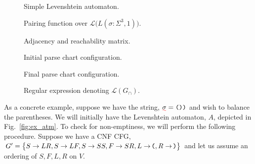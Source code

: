 \documentclass[sigplan,review,acmsmall,nonacm,screen,anonymous]{acmart}\settopmatter{printfolios=false,printccs=false,printacmref=false}
\begin{document}
\begin{figure}
\resizebox{0.4\textwidth}{!}{%

}
\caption{Simple Levenshtein automaton.}\label{fig:ex_atm}

\vspace{0.3cm}
\resizebox{0.4\textwidth}{!}{%

}
\caption{Pairing function over $\mathcal{L}\big(L(\sigma: \Sigma^3, 1)\big)$.}\label{fig:pairing_fun}

\vspace{0.3cm}
\begin{center}
\resizebox{0.35\textwidth}{!}{%

}
\end{center}
\vspace{-0.3cm}
\caption{Adjacency and reachability matrix.}\label{fig:reach_matr}

\vspace{0.3cm}
\resizebox{0.4\textwidth}{!}{

}
\caption{Initial parse chart configuration.}\label{fig:initial_pc}

\vspace{0.3cm}
\resizebox{0.4\textwidth}{!}{

}

\caption{Final parse chart configuration.}\label{fig:final_pc}

\begin{center}
\end{center}
\vspace{-0.3cm}
\caption{Regular expression denoting $\mathcal{L}(G_\cap)$.}\label{fig:re_tree}
\end{figure}

As a concrete example, suppose we have the string, $\err\sigma=\texttt{())}$ and wish to balance the parentheses. We will initially have the Levenshtein automaton, $A$, depicted in Fig.~\ref{fig:ex_atm}. To check for non-emptiness, we will perform the following procedure. Suppose we have a CNF CFG, $G'= \big\{S \rightarrow L R, S \rightarrow L F, S \rightarrow S S, F \rightarrow S R, L \rightarrow \hspace{-0.05cm}\texttt{(}, R \rightarrow\hspace{-0.05cm}\texttt{)}\big\}$ and let us assume an ordering of $S, F, L, R$ on $V$.
\end{document}
